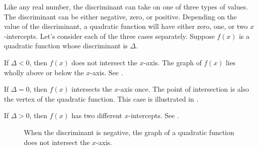\documentclass[a4paper,oneside,12pt]{article}
\begin{document}
Like any real number, the discriminant can take on one of three types
of values.  The discriminant can be either negative, zero, or
positive.  Depending on the value of the discriminant, a quadratic
function will have either zero, one, or two $x$-intercepts.  Let's
consider each of the three cases separately.  Suppose $f(x)$ is a
quadratic function whose discriminant is $\Delta$.

\begin{packedenumeral}
\item If $\Delta < 0$, then $f(x)$ does not intersect the $x$-axis.
  The graph of $f(x)$ lies wholly above or below the $x$-axis.  See
  .

\item If $\Delta = 0$, then $f(x)$ intersects the $x$-axis once.  The
  point of intersection is also the vertex of the quadratic function.
  This case is illustrated in .

\item If $\Delta > 0$, then $f(x)$ has two different $x$-intercepts.
  See .
\end{packedenumeral}

\begin{figure}[!htbp]
\centering
{}
\quad
\caption{%
  When the discriminant is negative, the graph of a quadratic function
  does not intersect the $x$-axis.
}
\label{fig:negative_discriminant}
\end{figure}
\end{document}
